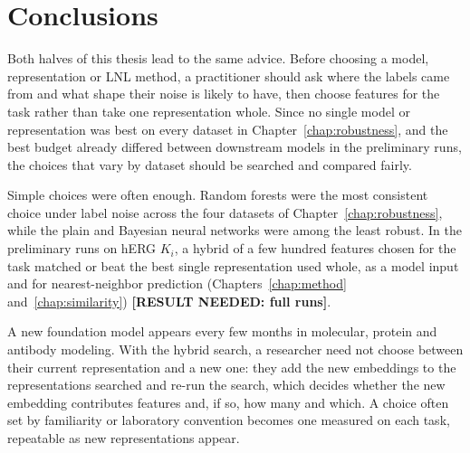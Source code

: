 \section{Conclusions}\label{sec:discussion:conclusions}

Both halves of this thesis lead to the same advice. Before choosing a model, representation or LNL method, a practitioner should ask where the labels came from and what shape their noise is likely to have, then choose features for the task rather than take one representation whole. Since no single model or representation was best on every dataset in Chapter~\ref{chap:robustness}, and the best budget already differed between downstream models in the preliminary runs, the choices that vary by dataset should be searched and compared fairly.

Simple choices were often enough. Random forests were the most consistent choice under label noise across the four datasets of Chapter~\ref{chap:robustness}, while the plain and Bayesian neural networks were among the least robust. In the preliminary runs on hERG $K_i$, a hybrid of a few hundred features chosen for the task matched or beat the best single representation used whole, as a model input and for nearest-neighbor prediction (Chapters~\ref{chap:method} and~\ref{chap:similarity}) \textbf{[RESULT NEEDED: full runs]}.

A new foundation model appears every few months in molecular, protein and antibody modeling. With the hybrid search, a researcher need not choose between their current representation and a new one: they add the new embeddings to the representations searched and re-run the search, which decides whether the new embedding contributes features and, if so, how many and which. A choice often set by familiarity or laboratory convention becomes one measured on each task, repeatable as new representations appear.


